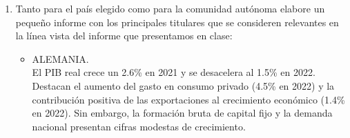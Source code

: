 \begin{enumerate}

    \item Tanto para el país elegido como para la comunidad autónoma elabore un pequeño informe con los principales titulares que se consideren relevantes en la línea vista del informe que presentamos en clase:\\

    \begin{itemize}

	\item ALEMANIA.\\

	    El PIB real crece un 2.6\% en 2021 y se desacelera al 1.5\% en 2022. Destacan el aumento del gasto en consumo privado (4.5\% en 2022) y la contribución positiva de las exportaciones al crecimiento económico (1.4\% en 2022). Sin embargo, la formación bruta de capital fijo y la demanda nacional presentan cifras modestas de crecimiento.


\end{itemize}
\end{enumerate}
